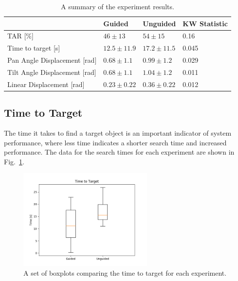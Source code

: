 \documentclass[runningheads]{llncs}
\newcommand\todo[1]{\textcolor{red}{#1}}
\begin{document}
\begin{table}
  \centering
  \caption{A summary of the experiment results. }\label{tab:results}
  \begin{tabular}{p{5cm}p{2cm}p{2cm}p{2.5cm}}
    \toprule
    & \textbf{Guided} & \textbf{Unguided}  & \textbf{KW Statistic} \\\midrule
    TAR [\%]           & $46\pm13$ & $54\pm15$ &  0.16 \\\midrule
    Time to target [s] & $12.5\pm11.9$ & $17.2\pm11.5$ & 0.045 \\\midrule
    Pan Angle Displacement [rad] & $0.68\pm1.1$ & $0.99\pm1.2$ & 0.029 \\\midrule
    Tilt Angle Displacement [rad] & $0.68\pm1.1$ & $1.04\pm1.2$ & 0.011 \\\midrule
    Linear Displacement [rad] & $0.23\pm0.22$ & $0.36\pm0.22$ & 0.012 \\\midrule
    \bottomrule
  \end{tabular}
\end{table}

\subsection{Time to Target}

The time it takes to find a target object is an important indicator of system performance, where less time indicates a shorter search time and increased performance.
The data for the search times for each experiment are shown in Fig.~\ref{fig:boxplot-time}.%

\begin{figure}
  \centering
  \includegraphics[width=0.6\textwidth]{figures/boxplot_time_to_target.png}
  \caption{A set of boxplots comparing the time to target for each experiment. }\label{fig:boxplot-time}
\end{figure}
\end{document}
